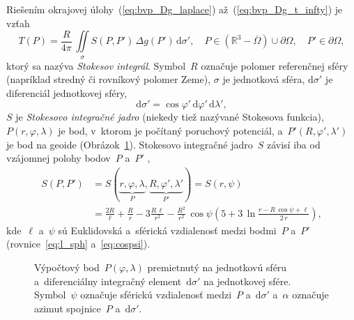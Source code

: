 \documentclass[a4paper, 12pt]{book}
\newcommand{\diff}{\mathrm d}
\begin{document}
Riešením okrajovej úlohy~(\ref{eq:bvp_Dg_laplace}) až~(\ref{eq:bvp_Dg_t_infty}) 
je vzťah
%
\begin{equation}
\label{eq:stokes}
T(P) = \frac{R}{4\pi} \, \iint\limits_{\sigma} S(P, P') \, \Delta g(P') \, 
\diff \sigma'{,} \quad P \in \left( \mathbb{R}^3 - \overline\Omega \right) \cup 
\partial\Omega{,} \quad P' \in \partial\Omega{,}
\end{equation}
%
ktorý sa nazýva \emph{Stokesov integrál}.  Symbol~$R$ označuje polomer 
referenčnej sféry (napríklad stredný či rovníkový polomer Zeme), $\sigma$ je 
jednotková sféra, $\diff\sigma'$ je diferenciál jednotkovej sféry,
%
\begin{equation}
\label{eq:diff_sigma}
\diff\sigma' = \cos\varphi' \, \diff\varphi' \, \diff\lambda'{,}
\end{equation}
%
$S$ je \emph{Stokesovo integračné jadro} (niekedy tiež nazývané Stokesova 
funkcia), $P(r, \varphi, \lambda)$ je bod, v~ktorom je počítaný poruchový 
potenciál, a~$P'(R, \varphi', \lambda')$ je bod na geoide 
(Obrázok~\ref{fig:surface_integral}).  Stokesovo integračné jadro~$S$ závisí 
iba od vzájomnej polohy bodov~$P$ a~$P'$ \parencite{MoritzPhysicalGeodesy},
%
\begin{equation}
\label{eq:stokes_kernel_general}
\begin{split}
S(P, P') &= S(\underbrace{r, \varphi, \lambda}_{P}, \underbrace{R, \varphi', 
\lambda'}_{P'}) = S(r, \psi)\\
%
&= \frac{2R}{\ell} + \frac{R}{r} - 3\frac{R \, \ell}{r^2} - \frac{R^2}{r^2} \, 
\cos\psi\left( 5 + 3 \, \ln \frac{r - R \, \cos\psi + \ell}{2 \, r} \right){,}
\end{split}
\end{equation}
%
kde~$\ell$ a~$\psi$ sú Euklidovská a~sférická vzdialenosť medzi bodmi~$P$ 
a~$P'$ (rovnice~\ref{eq:l_sph} a~\ref{eq:cospsi}).

\begin{figure}[bt]
\centering

\caption{Výpočtový bod~$P(\varphi, \lambda)$ premietnutý na jednotkovú sféru 
a~diferenciálny integračný element~$\diff\sigma'$ na jednotkovej sfére.  
Symbol~$\psi$ označuje sférickú vzdialenosť medzi~$P$ a~$\diff\sigma'$ 
a~$\alpha$ označuje azimut spojnice~$P$ a~$\diff\sigma'$.}
\label{fig:surface_integral}
\end{figure}
\end{document}
